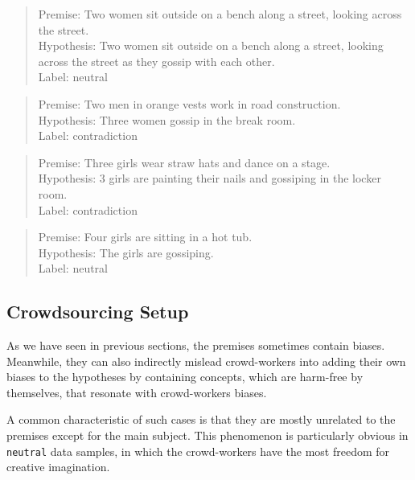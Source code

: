 \documentclass[11pt]{article}
\begin{document}
    \begin{quote}
        Premise: Two women sit outside on a bench along a street, looking across the street. \\
        Hypothesis: Two women sit outside on a bench along a street, looking across the street as they gossip with each other. \\
        Label: neutral
    \end{quote}

    \begin{quote}
        Premise: Two men in orange vests work in road construction. \\
        Hypothesis: Three women gossip in the break room. \\
        Label: contradiction
    \end{quote}

    \begin{quote}
        Premise: Three girls wear straw hats and dance on a stage. \\
        Hypothesis: 3 girls are painting their nails and gossiping in the locker room. \\
        Label: contradiction \\
    \end{quote}

    \begin{quote}
        Premise: Four girls are sitting in a hot tub. \\
        Hypothesis: The girls are gossiping. \\
        Label: neutral
    \end{quote}

    \subsection{Crowdsourcing Setup}

    As we have seen in previous sections, the premises sometimes contain biases.
    Meanwhile, they can also indirectly mislead crowd-workers into adding their own biases to the hypotheses by
    containing concepts, which are harm-free by themselves, that resonate with crowd-workers biases.

    A common characteristic of such cases is that they are mostly unrelated to the premises except for the main
    subject.
    This phenomenon is particularly obvious in \texttt{neutral} data samples, in which the crowd-workers have the most
    freedom for creative imagination.
\end{document}
